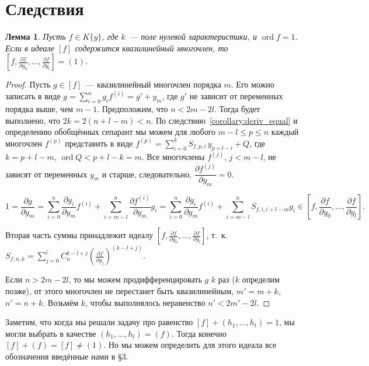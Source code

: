 \documentclass[16pt]{article}
\DeclareMathOperator{\ord}{ord}
\theoremstyle{plain1}
\newtheorem{lemma}[theorem1]{Лемма}
\theoremstyle{plain2}
\theoremstyle{plain}
\theoremstyle{plain3}
\theoremstyle{definition}
\theoremstyle{remark}
\begin{document}
\section{Следствия}

\begin{lemma}
Пусть $f\in K\{y\}$, где $k$~--- поле нулевой характеристики, и $\ord f = 1$.
Если в идеале $[f]$ содержится квазилинейный многочлен, то $\left[f,\frac{\partial f}{\partial y_0},\ldots,\frac{\partial f}{\partial y_l}\right]=(1)$.
\end{lemma}

\begin{proof}
Пусть $g\in [f]$~--- квазилинейный многочлен порядка $m$.
Его можно записать в виде $g=\sum\limits_{i=0}^ng_if^{(i)}=g'+y_m$, где $g'$ не зависит от переменных порядка выше, чем $m-1$.
Предположим, что $n<2m-2l$. Тогда будет выполнено, что $2k=2(n+l-m)<n$.
По следствию~\ref{corollary:deriv_equal} и определению обобщённых сепарант мы можем для любого $m-l\leqslant p\leqslant n$  каждый многочлен $f^{(p)}$ представить в виде $f^{(p)}=\sum\limits_{i=0}^{k} S_{f,p,i} \, y_{p+l -i}+ Q$, где $k=p+l-m$, $\ord Q < p+l-k=m$.
Все многочлены $f^{(j)}$, $j<m-l$, не зависят от переменных $y_m$ и старше, следовательно, $\dfrac{\partial f^{(j)}}{\partial y_m}=0$.

$$
1= \frac{\partial g}{\partial y_m}=\sum\limits_{i=0}^{n}\frac{\partial g_i}{\partial y_m}f^{(i)}+\sum\limits_{i=m-l}^{n}\frac{\partial f^{(i)}}{\partial y_m}g_i= \sum\limits_{i=0}^{n}\frac{\partial g_i}{\partial y_m}f^{(i)}+\sum\limits_{i=m-l}^{n}S_{f,i,i+l-m}g_i\in \left[f,\frac{\partial f}{\partial y_0},\ldots,\frac{\partial f}{\partial y_l}\right].
$$

Вторая часть суммы принадлежит идеалу $\left[f,\frac{\partial f}{\partial y_0},\ldots,\frac{\partial f}{\partial y_l}\right]$,
т.~к. $S_{f,n,k}=\sum\limits_{j=0}^{l}C_n^{k - l + j
}\left(\frac{\partial f}{\partial y_j}\right)^{(k - l + j)}$. %

Если $n>2m-2l$, то мы можем продифференцировать $g$ $k$ раз ($k$ определим позже), от этого многочлен не перестанет быть квазилинейным, $m'=m+k$, $n'=n+k$. Возьмём $k$, чтобы выполнялось неравенство $n'<2m'-2l$.

\end{proof}

Заметим, что когда мы решали задачу про равенство $[f]+(h_1,\ldots,h_t)=1$, мы могли выбрать в качестве $ (h_1,\ldots,h_t)=(f)$. Тогда конечно $[f]+(f)=[f]\ne (1)$. Но мы можем определить для этого идеала все обозначения введённые нами в \S3.
\end{document}
